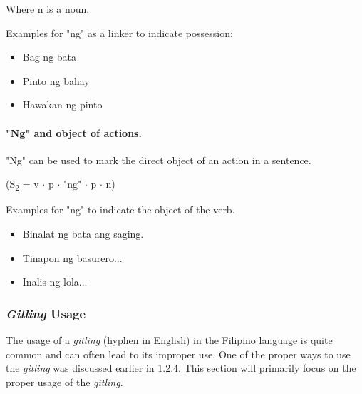 Where n is a noun. \\

\begin{example}
      Examples for "ng" as a linker to indicate possession:
\end{example}
\begin{itemize}
      \item Bag ng bata
      \item Pinto ng bahay
      \item Hawakan ng pinto
\end{itemize}

\paragraph{"Ng" and object of actions.}"Ng" can be used to mark the direct object
of an action in a sentence.
\begin{center}
      (S\textsubscript{2} = v \(\cdot\) p \(\cdot\) "ng" \(\cdot\) p \(\cdot\) n)
\end{center}

\begin{example}
      Examples for "ng" to indicate the object of the verb.
\end{example}
\begin{itemize}
      \item Binalat ng bata ang saging.
      \item Tinapon ng basurero...
      \item Inalis ng lola...
\end{itemize}

\subsubsection{\textit{Gitling} Usage}
The usage of a \textit{\textit{gitling}} (hyphen in English) in the Filipino language is quite common and can often lead to its improper use. One of the proper ways to use the \textit{\textit{gitling}} was discussed earlier in 1.2.4. This section will primarily focus on the proper usage of the \textit{\textit{gitling}}.

